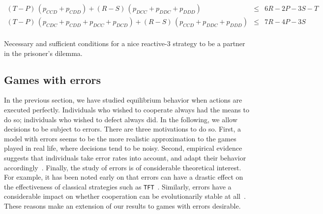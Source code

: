 \documentclass[9pt,twoside,lineno]{pnas-new}
\theoremstyle{plainCl1}
\theoremstyle{plainCl2}
\def\tft{\texttt{TFT}}
\begin{document}
\begin{table}[t!]
{{\begin{equation*}
\begin{array}{rcl}
    (T - P)\,(p_{CCD} + p_{CDD}) + (R - S)\,(p_{DCC} + p_{DDC} + p_{DDD}) & \le & 6 R \!-\! 2 P \!-\! 3 S \!-\! T \\ [0.2cm]
    (T - P)\,(p_{CDC} + p_{CDD} + p_{DCC} + p_{DCD}) + (R - S)\,(p_{CCD} + p_{DDC} + p_{DDD}) & \le & 7 R \!-\! 4 P \!-\! 3 S \\ [0.2cm]
 \end{array}
 \end{equation*}
 }}
 \caption{Necessary and sufficient conditions for a nice reactive-3 strategy to be a partner in the  prisoner's dilemma.}
 \label{Tab:PartnerReactiveThreePD}
 \end{table}
 
 
 
 
 
 
 
 

\subsection{Games with errors}
\label{section:errors}

In the previous section, we have studied equilibrium behavior when actions are executed perfectly. 
Individuals who wished to cooperate always had the means to do so; individuals who wished to defect always did.
In the following, we allow decisions to be subject to errors.
There are three motivations to do so. 
First, a model with errors seems to be the more realistic approximation to the games played in real life, where decisions tend to be noisy. 
Second, empirical evidence suggests that individuals take error rates into account, and adapt their behavior accordingly~\cite{fudenberg:aer:2012,Arechar:GEB:2017}. 
Finally, the study of errors is of considerable theoretical interest. 
For example, it has been noted early on that errors can have a drastic effect on the effectiveness of classical strategies such as \tft{}~\citep{molander:jcr:1985, axelrod:Science:1988, wu:JCR:1995}. 
Similarly, errors have a considerable impact on whether cooperation can be evolutionarily stable at all~\citep{boyd:Nature:1987,boyd:JTB:1989,garcia:jet:2016}. 
These reasons make an extension of our results to games with errors desirable. 
\end{document}
